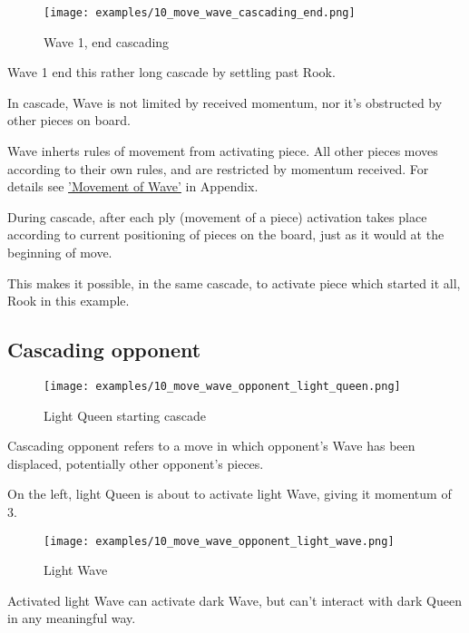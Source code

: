 \clearpage %

\noindent
\begin{wrapfigure}[3]{l}{0.5625\textwidth}
\centering
\texttt{[image: examples/10\_move\_wave\_cascading\_end.png]}
\caption{Wave 1, end cascading}
\label{fig:10_move_wave_cascading_end}
\end{wrapfigure}
Wave 1 end this rather long cascade by settling past Rook.

\vspace*{0.345\textheight}
In cascade, Wave is not limited by received momentum, nor it's obstructed by
other pieces on board.

Wave inherts rules of movement from activating piece. All other pieces moves
according to their own rules, and are restricted by momentum received. For details
see \hyperref[sec:Appendix/Movement of Wave]{'Movement of Wave'} in Appendix.

During cascade, after each ply (movement of a piece) activation takes place
according to current positioning of pieces on the board, just as it would
at the beginning of move.

This makes it possible, in the same cascade, to activate piece which started
it all, Rook in this example.

\clearpage %

\subsection*{Cascading opponent}

\noindent
\begin{wrapfigure}[10]{l}{0.5625\textwidth}
\centering
\texttt{[image: examples/10\_move\_wave\_opponent\_light\_queen.png]}
\caption{Light Queen starting cascade}
\label{fig:10_move_wave_opponent_light_queen}
\end{wrapfigure}
Cascading opponent refers to a move in which opponent's Wave has been displaced,
potentially other opponent's pieces.

On the left, light Queen is about to activate light Wave, giving it momentum of 3.

\vspace*{0.155\textheight}
\noindent
\begin{wrapfigure}[5]{r}{0.5625\textwidth}
\centering
\texttt{[image: examples/10\_move\_wave\_opponent\_light\_wave.png]}
\caption{Light Wave}
\label{fig:10_move_wave_opponent_light_wave}
\end{wrapfigure}
Activated light Wave can activate dark Wave, but can't interact with dark Queen in
any meaningful way.

